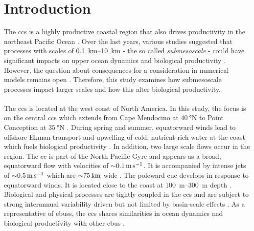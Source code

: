 \chapter{Introduction}\label{sec:introduction}

The \ac{ccs} is a highly productive coastal region \autocite{carr-2001-mostprod} that also drives productivity in the northeast Pacific Ocean \autocite{gruber-2011-eddy-red, nagai-2015-dom-role-meso, renault-2016-decoupling-prod, frischknecht-2018-3dpump}. Over the last years, various studies suggested that processes with scales of \SIrange{0.1}{10}{\kilo\metre} - the so called \textit{submesoscale} - could have significant impacts on upper ocean dynamics \autocite{thomas-2005-downfront-wind, boccaletti-2007, capet-2008-fronts1, sasaki-2014-mli-for-eddies, mcwilliams-2016-subm-currents, mahadevan-2016-subm-review, mcwilliams-2019-survey-subm, schubert-2020-subm-energy-cascade} and biological productivity \autocite{levy-2001-submesoscale-oligotrophic, lapeyre-2006-subm-vertical-pump, levy-2012-physics-to-life, omand-2015-poc-export, mahadevan-2016-subm-review, stukel-2017-carbon-export, levy-2018-role-structuring, kessouri-2020-seasonal-prod}. However, the question about consequences for a consideration in numerical models remains open \autocite{fox-kemper-2019-challenges}. Therefore, this study examines how submesoscale processes impact larger scales and how this alter biological productivity.\\
\\
The \ac{ccs} is located at the west coast of North America. In this study, the focus is on the central \ac{ccs} which extends from Cape Mendocino at $\SI{40}{\degree}$N to Point Conception at $\SI{35}{\degree}$N \autocite{checkley-2009-currentstructure-calcs}. During spring and summer, equatorward winds lead to offshore Ekman transport and upwelling of cold, nutrient-rich water at the coast which fuels biological productivity \autocite{huyer-1983-upwelling}. In addition, two large scale flows occur in the region. The \ac{cc} is part of the North Pacific Gyre and appears as a broad, equatorward flow with velocities of ${\sim} \SI{0.1}{\metre\per\second}$. It is accompanied by intense jets of ${\sim} \SI{0.5}{\metre\per\second}$ which are ${\sim} \SI{75}{\kilo\metre}$ wide \autocite{huyer-1991-jet}. The poleward \ac{cuc} develops in response to equatorward winds. It is located close to the coast at \SIrange{100}{300}{\metre} depth \autocite{mccreary-1987-dynamics-calcs}. Biological and physical processes are tightly coupled in the \ac{ccs} \autocite{bograd-2001-physbiocoupling} and are subject to strong interannual variability driven but not limited by basin-scale effects \autocite{frischknecht-2015-remote}. As a representative of \acp{ebus}, the \ac{ccs} shares similarities in ocean dynamics and biological productivity with other \ac{ebus} \autocite{chavez-2009-ebus}.\\
